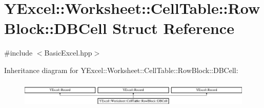 \hypertarget{struct_y_excel_1_1_worksheet_1_1_cell_table_1_1_row_block_1_1_d_b_cell}{}\section{Y\+Excel\+:\+:Worksheet\+:\+:Cell\+Table\+:\+:Row\+Block\+:\+:D\+B\+Cell Struct Reference}
\label{struct_y_excel_1_1_worksheet_1_1_cell_table_1_1_row_block_1_1_d_b_cell}


{\ttfamily \#include $<$Basic\+Excel.\+hpp$>$}

Inheritance diagram for Y\+Excel\+:\+:Worksheet\+:\+:Cell\+Table\+:\+:Row\+Block\+:\+:D\+B\+Cell\+:\begin{figure}[H]
\begin{center}
\leavevmode
\includegraphics[height=1.287356cm]{struct_y_excel_1_1_worksheet_1_1_cell_table_1_1_row_block_1_1_d_b_cell}
\end{center}
\end{figure}
